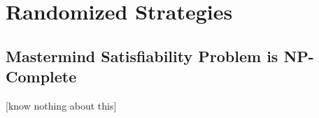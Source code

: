 \section{Randomized Strategies}

\subsection{Mastermind Satisfiability Problem is NP-Complete}

[know nothing about this]